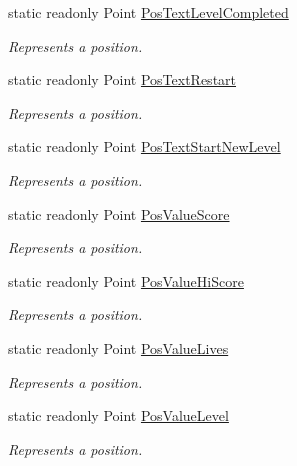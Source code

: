 \begin{DoxyCompactItemize}
static readonly Point \mbox{\hyperlink{class_o_e_invaders_1_1_logic_1_1_game_logic_ac1082bc2165eb7155c1b9033358ca3c8}{Pos\+Text\+Level\+Completed}}
\begin{DoxyCompactList}\small\item\em Represents a position. \end{DoxyCompactList}\item 
static readonly Point \mbox{\hyperlink{class_o_e_invaders_1_1_logic_1_1_game_logic_a1de1ef74d65b308a612255275e9e1033}{Pos\+Text\+Restart}}
\begin{DoxyCompactList}\small\item\em Represents a position. \end{DoxyCompactList}\item 
static readonly Point \mbox{\hyperlink{class_o_e_invaders_1_1_logic_1_1_game_logic_a1ac144e9aab3d1f0c95d96f649caefc6}{Pos\+Text\+Start\+New\+Level}}
\begin{DoxyCompactList}\small\item\em Represents a position. \end{DoxyCompactList}\item 
static readonly Point \mbox{\hyperlink{class_o_e_invaders_1_1_logic_1_1_game_logic_a31da7f74cec3da1423b78bef4c957da4}{Pos\+Value\+Score}}
\begin{DoxyCompactList}\small\item\em Represents a position. \end{DoxyCompactList}\item 
static readonly Point \mbox{\hyperlink{class_o_e_invaders_1_1_logic_1_1_game_logic_a5b415d90a7e37bf9acbd1d704862aea5}{Pos\+Value\+Hi\+Score}}
\begin{DoxyCompactList}\small\item\em Represents a position. \end{DoxyCompactList}\item 
static readonly Point \mbox{\hyperlink{class_o_e_invaders_1_1_logic_1_1_game_logic_aa3773509cad278dd3c990da4f44e18d0}{Pos\+Value\+Lives}}
\begin{DoxyCompactList}\small\item\em Represents a position. \end{DoxyCompactList}\item 
static readonly Point \mbox{\hyperlink{class_o_e_invaders_1_1_logic_1_1_game_logic_a04dc31524c700102a8ceb99edca77116}{Pos\+Value\+Level}}
\begin{DoxyCompactList}\small\item\em Represents a position. \end{DoxyCompactList}\item 

\end{DoxyCompactItemize}
